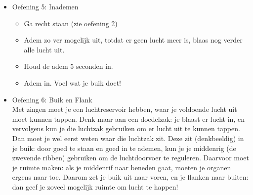 \begin{itemize}
\item Oefening 5: Inademen
\begin{itemize} 
\item Ga recht staan (zie oefening 2)
\item Adem zo ver mogelijk uit, totdat er geen lucht meer is, blaas nog verder alle lucht uit.
\item Houd de adem 5 seconden in.
\item Adem in. Voel wat je buik doet!
\end{itemize}
\item Oefening 6: Buik en Flank \\
Met zingen moet je een luchtreservoir hebben, waar je voldoende lucht uit moet kunnen tappen. Denk maar aan een doedelzak: je blaast er lucht in, en vervolgens kun je die luchtzak gebruiken om er lucht uit te kunnen tappen. Dan moet je wel eerst weten waar die luchtzak zit. Deze zit (denkbeeldig) in je buik: door goed te staan en goed in te ademen, kun je je middenrig (de zwevende ribben) gebruiken om de luchtdoorvoer te reguleren. Daarvoor moet je ruimte maken: als je middenrif naar beneden gaat, moeten je organen ergens naar toe. Daarom zet je buik uit naar voren, en je flanken naar buiten: dan geef je zoveel mogelijk ruimte om lucht te happen! \\


\end{itemize}
